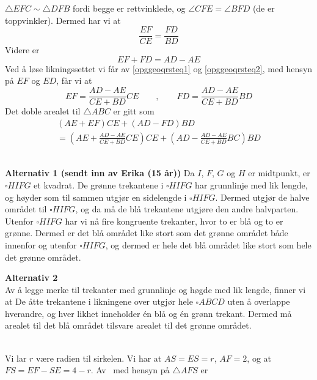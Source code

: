 $ {\triangle EFC \sim \triangle DFB} $ fordi begge er rettvinklede, og $ {\angle CFE = \angle BFD}$ (de er toppvinkler). Dermed har vi at
\begin{equation}\label{opggeoqrsteq1}
	\frac{EF}{CE}=\frac{FD}{BD} 
\end{equation}
Videre er
\begin{equation}\label{opggeoqrsteq2}
	EF+FD= AD-AE
\end{equation}
Ved å løse likningssettet vi får av \eqref{opggeoqrsteq1} og \eqref{opggeoqrsteq2}, med hensyn på $ EF $ og $ ED $, får vi at
\[ 
EF = \frac{AD-AE}{CE+BD}CE\qquad,\qquad  FD=\frac{AD-AE}{CE+BD}BD
\]
Det doble arealet til $ \triangle ABC $ er gitt som
\begin{multline*}
(AE+EF)CE+(AD-FD)BD \\=\left(AE+\frac{AD-AE}{CE+BD}CE\right)CE+\left(AD-\frac{AD-AE}{CE+BD}BC\right)BD	
\end{multline*}

\newpage
{} \\
\textbf{Alternativ 1 (sendt inn av Erika (15 år))} \os 
Da $I$, $F$, $G$ og $H$ er midtpunkt, er $\square HIFG$ et kvadrat. De grønne trekantene i $\square HIFG$ har grunnlinje med lik lengde, og høyder som til sammen utgjør en sidelengde i $\square HIFG$. Dermed utgjør de halve området til $\square HIFG$, og da må de blå trekantene utgjøre den andre halvparten. Utenfor $\square HIFG$ har vi nå fire kongruente trekanter, hvor to er blå og to er grønne. Dermed er det blå området like stort som det grønne området både innenfor og utenfor $\square HIFG$, og dermed er hele det blå området like stort som hele det grønne området.


\textbf{Alternativ 2} \\
Av å legge merke til trekanter med grunnlinje og høgde med lik lengde, finner vi at
De åtte trekantene i likningene over utgjør hele $\square ABCD$ uten å overlappe hverandre, og hver likhet inneholder én blå og én grønn trekant. Dermed må arealet til det blå området tilsvare arealet til det grønne området.

\\
Vi lar $ r $ være radien til sirkelen. Vi har at $ AS=ES=r $, $ AF=2 $, og at $ FS=EF-SE=4-r $. Av \pyt\ med hensyn på $ \triangle AFS $ er
\newpage


